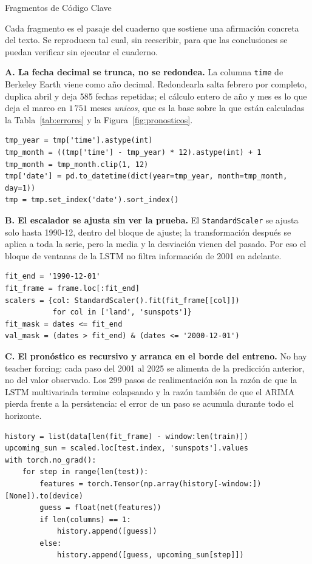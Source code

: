\documentclass[10pt,journal]{IEEEtran}
\begin{document}
  \appendix
  Fragmentos de C\'odigo Clave

  Cada fragmento es el pasaje del cuaderno que sostiene una afirmaci\'on concreta del texto. Se reproducen tal cual, sin reescribir, para que las conclusiones se puedan verificar sin ejecutar el cuaderno.

  \textbf{A. La fecha decimal se trunca, no se redondea.}
  La columna \texttt{time} de Berkeley Earth viene como a\~no decimal. Redondearla salta febrero por completo, duplica abril y deja 585 fechas repetidas; el c\'alculo entero de a\~no y mes es lo que deja el marco en $1\,751$ meses \emph{unicos}, que es la base sobre la que est\'an calculadas la Tabla~\ref{tab:errores} y la Figura~\ref{fig:pronosticos}.

\begin{lstlisting}
tmp_year = tmp['time'].astype(int)
tmp_month = ((tmp['time'] - tmp_year) * 12).astype(int) + 1
tmp_month = tmp_month.clip(1, 12)
tmp['date'] = pd.to_datetime(dict(year=tmp_year, month=tmp_month, day=1))
tmp = tmp.set_index('date').sort_index()
  \end{lstlisting}

  \textbf{B. El escalador se ajusta sin ver la prueba.}
  El {\tt StandardScaler} se ajusta solo hasta 1990-12, dentro del bloque de ajuste; la transformaci\'on despu\'es se aplica a toda la serie, pero la media y la desviaci\'on vienen del pasado. Por eso el bloque de ventanas de la LSTM no filtra informaci\'on de 2001 en adelante.

\begin{lstlisting}
fit_end = '1990-12-01'
fit_frame = frame.loc[:fit_end]
scalers = {col: StandardScaler().fit(fit_frame[[col]])
           for col in ['land', 'sunspots']}
fit_mask = dates <= fit_end
val_mask = (dates > fit_end) & (dates <= '2000-12-01')
  \end{lstlisting}

  \textbf{C. El pron\'ostico es recursivo y arranca en el borde del entreno.}
  No hay teacher forcing: cada paso del 2001 al 2025 se alimenta de la predicci\'on anterior, no del valor observado. Los 299 pasos de realimentaci\'on son la raz\'on de que la LSTM multivariada termine colapsando y la raz\'on tambi\'en de que el ARIMA pierda frente a la persistencia: el error de un paso se acumula durante todo el horizonte.

\begin{lstlisting}
history = list(data[len(fit_frame) - window:len(train)])
upcoming_sun = scaled.loc[test.index, 'sunspots'].values
with torch.no_grad():
    for step in range(len(test)):
        features = torch.Tensor(np.array(history[-window:])[None]).to(device)
        guess = float(net(features))
        if len(columns) == 1:
            history.append([guess])
        else:
            history.append([guess, upcoming_sun[step]])
  \end{lstlisting}
\end{document}
